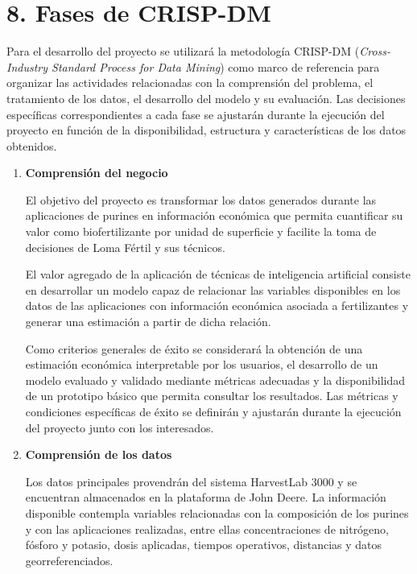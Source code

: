 \documentclass[
11pt, %
]{charter}
\begin{document}
\section{8. Fases de CRISP-DM}

Para el desarrollo del proyecto se utilizará la metodología CRISP-DM (\textit{Cross-Industry Standard Process for Data Mining}) como marco de referencia para organizar las actividades relacionadas con la comprensión del problema, el tratamiento de los datos, el desarrollo del modelo y su evaluación. Las decisiones específicas correspondientes a cada fase se ajustarán durante la ejecución del proyecto en función de la disponibilidad, estructura y características de los datos obtenidos.

\begin{enumerate}

  \item \textbf{Comprensión del negocio}

  El objetivo del proyecto es transformar los datos generados durante las aplicaciones de purines en información económica que permita cuantificar su valor como biofertilizante por unidad de superficie y facilite la toma de decisiones de Loma Fértil y sus técnicos.

  El valor agregado de la aplicación de técnicas de inteligencia artificial consiste en desarrollar un modelo capaz de relacionar las variables disponibles en los datos de las aplicaciones con información económica asociada a fertilizantes y generar una estimación a partir de dicha relación.

  Como criterios generales de éxito se considerará la obtención de una estimación económica interpretable por los usuarios, el desarrollo de un modelo evaluado y validado mediante métricas adecuadas y la disponibilidad de un prototipo básico que permita consultar los resultados. Las métricas y condiciones específicas de éxito se definirán y ajustarán durante la ejecución del proyecto junto con los interesados.


  \item \textbf{Comprensión de los datos}

  Los datos principales provendrán del sistema HarvestLab 3000 y se encuentran almacenados en la plataforma de John Deere. La información disponible contempla variables relacionadas con la composición de los purines y con las aplicaciones realizadas, entre ellas concentraciones de nitrógeno, fósforo y potasio, dosis aplicadas, tiempos operativos, distancias y datos georreferenciados.


\end{enumerate}
\end{document}
